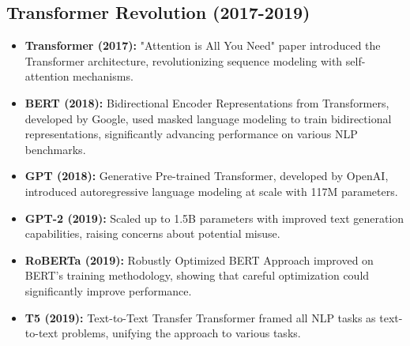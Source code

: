 \documentclass[11pt,a4paper]{report}
\begin{document}
\subsection{Transformer Revolution (2017-2019)}
\begin{itemize}
    \item \textbf{Transformer (2017):} "Attention is All You Need" paper introduced the Transformer architecture, revolutionizing sequence modeling with self-attention mechanisms.
    
    \item \textbf{BERT (2018):} Bidirectional Encoder Representations from Transformers, developed by Google, used masked language modeling to train bidirectional representations, significantly advancing performance on various NLP benchmarks.
    
    \item \textbf{GPT (2018):} Generative Pre-trained Transformer, developed by OpenAI, introduced autoregressive language modeling at scale with 117M parameters.
    
    \item \textbf{GPT-2 (2019):} Scaled up to 1.5B parameters with improved text generation capabilities, raising concerns about potential misuse.
    
    \item \textbf{RoBERTa (2019):} Robustly Optimized BERT Approach improved on BERT's training methodology, showing that careful optimization could significantly improve performance.
    
    \item \textbf{T5 (2019):} Text-to-Text Transfer Transformer framed all NLP tasks as text-to-text problems, unifying the approach to various tasks.
\end{itemize}
\end{document}
